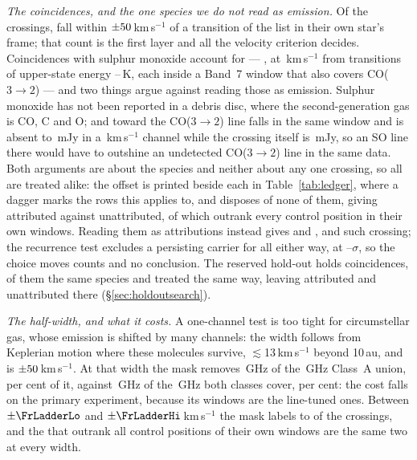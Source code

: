 \begin{table}
\centering
\footnotesize
\caption{The line mask, by species: the number of transitions $N$ it holds,
the frequency range they span inside the searched intervals and their
upper-state energies. Hydrogen recombination lines carry no tabulated
$E_{\rm u}$. The transition-by-transition list is in the data release.}
\label{tab:masklines}

\end{table}

\emph{The coincidences, and the one species we do not read as emission.} Of
the \NCross{} crossings, \MkNCoinc{} fall within
$\pm50$\,km\,s$^{-1}$ of a transition of the list in their own
star's frame; that count is the first layer and all the velocity criterion
decides. Coincidences with sulphur monoxide account for \MkNSODecide{} ---
\MkSOStars, at \MkSODvList\,km\,s$^{-1}$ from transitions of upper-state
energy \MkSOEuLo--\MkSOEuHi\,K, each inside a Band~7 window that also covers
CO($3\to2$) --- and two things argue against reading those as emission.
Sulphur monoxide has not been reported in a debris disc, where the
second-generation gas is CO, C and O; and toward \FrCpStar{} the CO($3\to2$)
line falls in the same window and is absent to \FrCpCoLimMJy\,mJy in a
\FrCpCoChanKms\,km\,s$^{-1}$ channel while the crossing itself is
\FrCpFluxMJy\,mJy, so an SO line there would have to outshine an undetected
CO($3\to2$) line in the same data. Both arguments are about the species and
neither about any one crossing, so all \MkNSODecide{} are treated alike: the
offset is printed beside each in Table~\ref{tab:ledger}, where a dagger marks
the rows this applies to, and disposes of none of them, giving
\MkAttr{} attributed against \MkUnattr{} unattributed, of
which \MkRankLeadWord{} outrank every control position in their own windows.
Reading them as attributions instead gives \MkAttrAlt{} and \MkUnattrAlt,
and \MkRankLeadAlt{} such crossing; the recurrence test excludes a persisting
carrier for all \MkNSODecide{} either way, at
\MkAttrExclLo--\MkAttrExclHi$\sigma$, so the choice moves counts and no
conclusion. The reserved hold-out holds \HoNCoinc{} coincidences,
\HoNNoted{} of them the same species and treated the same way, leaving
\HoNAttr{} attributed and \HoNUnattr{} unattributed there
(\S\ref{sec:holdoutsearch}).

\emph{The half-width, and what it costs.} A one-channel test is too tight for
circumstellar gas, whose emission is shifted by many channels: the width
follows from Keplerian motion where these molecules survive,
$\lesssim$13\,km\,s$^{-1}$ beyond 10\,au, and is
$\pm50$\,km\,s$^{-1}$. At that width the mask removes
\MkMaskAGHz\,GHz of the \CvUnionA\,GHz Class~A union, \MkMaskAPct{} per cent
of it, against \FrMaskLostGHz\,GHz of the \FrMaskUnionGHz\,GHz both classes
cover, \FrMaskPct{} per cent: the cost falls on the primary experiment,
because its windows are the line-tuned ones. Between $\pm\FrLadderLo$ and
$\pm\FrLadderHi$\,km\,s$^{-1}$ the mask labels \FrAttrWTwenty{} to
\FrAttrWHundred{} of the crossings, and the \FrNRankPass{} that outrank all
\NCtrl{} control positions of their own windows are the same two at every
width.

